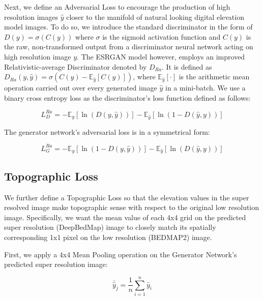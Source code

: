 \documentclass[tc, manuscript]{copernicus}
\begin{document}
Next, we define an Adversarial Loss to encourage the production of high resolution images $\hat{y}$ closer to the manifold of natural looking digital elevation model images.
To do so, we introduce the standard discriminator in the form of $D(y) = \sigma(C(y))$ where $\sigma$ is the sigmoid activation function and $C(y)$ is the raw, non-transformed output from a discriminator neural network acting on high resolution image $y$.
The ESRGAN model \citep{WangESRGANEnhancedSuperResolution2019} however, employs an improved Relativistic-average Discriminator \citep{Jolicoeur-Martineaurelativisticdiscriminatorkey2018} denoted by $D_{Ra}$.
It is defined as $D_{Ra}(y,\hat{y}) = \sigma(C(y) - \mathbb{E}_{\hat{y}}[C(\hat{y})])$, where $\mathbb{E}_{\hat{y}}[\cdot]$ is the arithmetic mean operation carried out over every generated image $\hat{y}$ in a mini-batch.
We use a binary cross entropy loss as the discriminator's loss function defined as follows:

\begin{equation}\label{eq:A2}
  L_D^{Ra} = - \mathbb{E}_y[\ln(D(y,\hat{y}))] - \mathbb{E}_{\hat{y}}[\ln(1 - D(\hat{y},y))]
\end{equation}

The generator network's adversarial loss is in a symmetrical form:

\begin{equation}\label{eq:A3}
  L_G^{Ra} = - \mathbb{E}_y[\ln(1 - D(y,\hat{y}))] - \mathbb{E}_{\hat{y}}[\ln(D(\hat{y},y))]
\end{equation}

\subsection{Topographic Loss}

We further define a Topographic Loss so that the elevation values in the super resolved image make topographic sense with respect to the original low resolution image.
Specifically, we want the mean value of each 4x4 grid on the predicted super resolution (DeepBedMap) image to closely match its spatially corresponding 1x1 pixel on the low resolution (BEDMAP2) image.

First, we apply a 4x4 Mean Pooling operation on the Generator Network's predicted super resolution image:

\begin{equation}\label{eq:A4}
 \bar{\hat{y}}_j = \dfrac{1}{n} \sum\limits_{i=1}^n \hat{y}_i
\end{equation}
\end{document}
